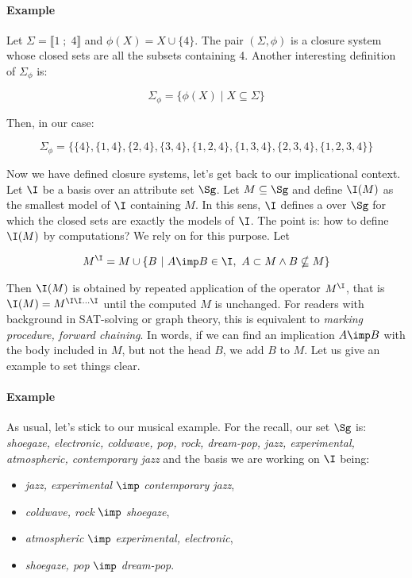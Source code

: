 \paragraph{Example} Let $\Sigma = \llbracket 1 \; ; \; 4 \rrbracket$ and 
$\phi(X) = X \cup \{4 \}$. The pair $(\Sigma, \phi)$ is a closure system whose
closed sets are all the subsets containing 4. Another interesting definition of 
$\Sigma_{\phi}$ is:

	\[ \Sigma_{\phi} = \{ \phi(X) \; | \; X \subseteq \Sigma \} \]

\noindent Then, in our case:

	\[ \Sigma_{\phi} = \{ \{ 4\}, \{ 1, 4\}, \{ 2, 4\},
		\{ 3, 4\}, \{ 1, 2, 4\}, \{ 1, 3, 4\},\{ 2, 3, 4\}, 
		\{ 1, 2, 3, 4\} \}
	\]

\vspace{1.2em}

\noindent Now we have defined closure systems, let's get back to our 
implicational context. Let $\I$ be a basis over an attribute set $\Sg$. Let $
M \subseteq \Sg$ and define $\I(M)$ as the smallest model of $\I$ containing 
$M$. In this sens, $\I$ defines a  over $\Sg$ for 
which the closed sets are exactly the models of $\I$. The point is: how to 
define $\I(M)$ by computations? We rely on \cite{CExp} for this purpose. Let 

	\[ M^{\I} = M \cup \{ B \ | \ A \imp B \in \I, \ A \subset M \land
			B \nsubseteq M \} 
	\]

\noindent Then $\I(M)$ is obtained by repeated application of the operator 
$M^{\I}$, that is $\I(M) = M^{\I \I \dots \I}$ until the computed $M$ is 
unchanged. For readers with background in SAT-solving or graph theory, this is
equivalent to \textit{marking procedure, forward chaining}. In words, if we can 
find an implication $A \imp B$
with the body included in $M$, but not the head $B$, we add $B$ to $M$. Let us 
give an 
example to set things clear.

\paragraph{Example} As usual, let's stick to our musical example. For the 
recall, our set $\Sg$ is: \textit{shoegaze, electronic, coldwave, pop, rock, 
dream-pop, jazz, experimental, atmospheric, contemporary jazz} and the basis
we are working on $\I$ being:
\begin{itemize}
	\item[ ] \textit{jazz, experimental} $\imp$ \textit{contemporary jazz},
	\item[ ] \textit{coldwave, rock}  $\imp$ \textit{shoegaze},
	\item[ ] \textit{atmospheric} $\imp$ \textit{experimental, electronic},
	\item[ ] \textit{shoegaze, pop} $\imp$ \textit{dream-pop}.
\end{itemize}

